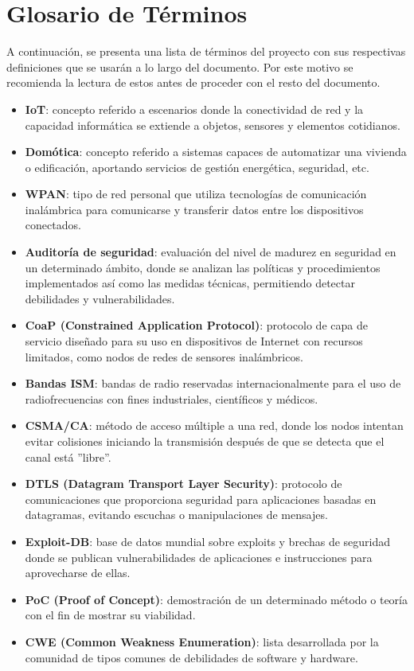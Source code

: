 \section{Glosario de Términos} %
A continuación, se presenta una lista de términos del proyecto con sus respectivas definiciones que se usarán a lo largo del documento. Por este motivo se recomienda la lectura de estos antes de proceder con el resto del documento.
\begin{itemize}
\item{\bf IoT}: concepto referido a escenarios donde la conectividad de
red y la capacidad informática se extiende a objetos, sensores y elementos cotidianos.
\item{\bf Domótica}: concepto referido a sistemas capaces de automatizar una vivienda o edificación, aportando servicios de gestión energética, seguridad, etc.
\item{\bf WPAN}: tipo de red personal que utiliza tecnologías de comunicación inalámbrica para comunicarse y transferir datos entre los dispositivos conectados.
\item{\bf Auditoría de seguridad}: evaluación del nivel de madurez en seguridad en un determinado ámbito, donde se analizan las políticas y procedimientos implementados así como las medidas técnicas, permitiendo detectar debilidades y vulnerabilidades.
\item{\bf CoaP (Constrained Application Protocol)}: protocolo de capa de servicio diseñado para su uso en dispositivos de Internet con recursos limitados, como nodos de redes de sensores inalámbricos.
\item{\bf Bandas ISM}: bandas de radio reservadas internacionalmente para el uso de radiofrecuencias con fines industriales, científicos y médicos.
\item{\bf CSMA/CA}: método de acceso múltiple a una red, donde los nodos intentan evitar colisiones iniciando la transmisión después de que se detecta que el canal está ''libre''.
\item{\bf DTLS (Datagram Transport Layer Security)}: protocolo de comunicaciones que proporciona seguridad para aplicaciones basadas en datagramas, evitando escuchas o manipulaciones de mensajes.
\item{\bf Exploit-DB}: base de datos mundial sobre exploits y brechas de seguridad donde se publican vulnerabilidades de aplicaciones e instrucciones para aprovecharse de ellas.
\item{\bf PoC (Proof of Concept)}: demostración de un determinado método o teoría con el fin de mostrar su viabilidad.
\item{\bf CWE (Common Weakness Enumeration)}: lista desarrollada por la comunidad de tipos comunes de debilidades de software y hardware.
\end{itemize}




